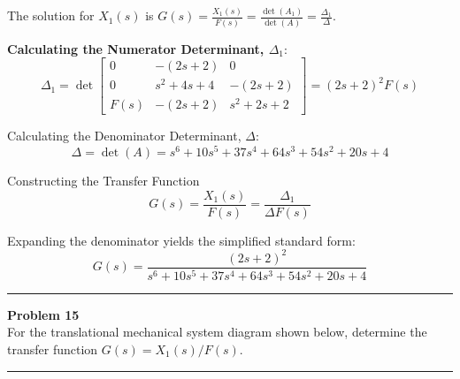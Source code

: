 \documentclass[11pt]{article}
\newcommand{\hspring}[2]{%
      \draw[spring] (#1) -- ++(2,0) node[midway, above=0.25cm]{#2};
    }
\newcommand{\hdamper}[2]{%
      \begin{scope}[shift={#1}]
        \draw (0,0) -- (0.5,0);                  %
        \draw (0.5,0) -- (0.5,0.3) -- (1.5,0.3);  %
        \draw (0.5,0) -- (0.5,-0.3) -- (1.5,-0.3);%
        
        \draw (1.0,0) -- (1.0,0.15);
        \draw (1.0,0) -- (1.0,-0.15);
        
        \draw (1.0,0) -- (2.0,0);
    
        \node[above] at (1,0.3) {#2};
      \end{scope}
    }
\newcommand{\tbody}[4]{
    \node[tbody] (#4) at (#1) {#2};
    \node at ([yshift=20mm]#4.center) {#3};
    \draw ([yshift=11mm]#4.center) -- ([yshift=18mm]#4.center);
    \draw[->] ([yshift=16mm, xshift=-4mm]#4.center) -- ([yshift=16mm, xshift=5mm]#4.center);
    }
\begin{document}
The solution for $X_1(s)$ is $G(s) = \frac{X_1(s)}{F(s)} = \frac{\det(A_1)}{\det(A)} = \frac{\Delta_1}{\Delta}$.

\vspace{12pt}
\noindent\textbf{Calculating the Numerator Determinant, $\Delta_1$}:
$$ \Delta_1 = \det
\begin{bmatrix}
0 & -(2s + 2) & 0 \\
0 & s^2 + 4s + 4 & -(2s + 2) \\
F(s) & -(2s + 2) & s^2 + 2s + 2
\end{bmatrix}
= (2s + 2)^2F(s) $$

{Calculating the Denominator Determinant, $\Delta$}:
$$\Delta = \det(A) = s^6 + 10s^5 + 37s^4 + 64s^3 + 54s^2 + 20s + 4$$

{Constructing the Transfer Function}
$$G(s) = \frac{X_1(s)}{F(s)} = \frac{\Delta_1}{\Delta F(s)}$$

Expanding the denominator yields the simplified standard form:
\[
\boxed{
G(s) = \frac{(2s + 2)^2}{s^6 + 10s^5 + 37s^4 + 64s^3 + 54s^2 + 20s + 4}
}
\]


\newpage
  \setcounter{page}{24}  
\noindent\rule{\textwidth}{1pt}
\noindent\textbf{Problem 15} \hfill
\\For the translational mechanical system diagram shown below, determine the transfer function $G(s)=X_1(s)/F(s)$.
\begin{center}
\end{center}
\noindent\rule{\textwidth}{1pt}
\end{document}
